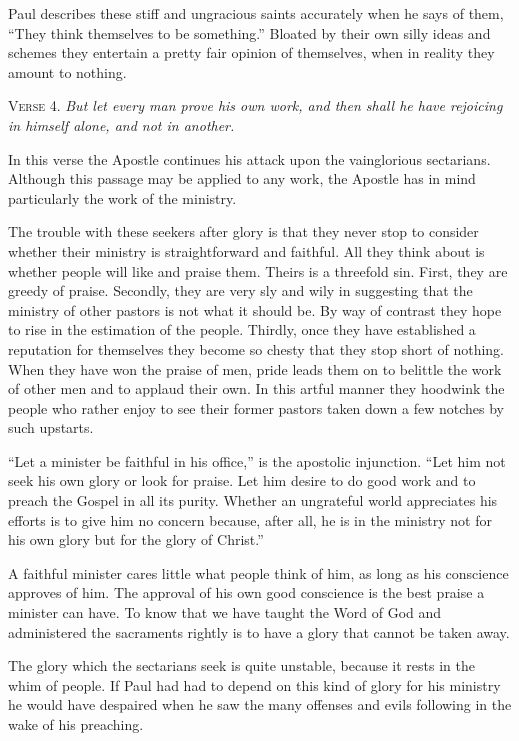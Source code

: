 Paul describes these stiff and ungracious saints accurately when he says of them, “They think themselves to be something.” Bloated by their own silly ideas and schemes they entertain a pretty fair opinion of themselves, when in reality they amount to nothing.

\textsc{Verse} 4. \emph{But let every man prove his own work, and then shall he have rejoicing in himself alone, and not in another.}

In this verse the Apostle continues his attack upon the vainglorious sectarians. Although this passage may be applied to any work, the Apostle has in mind particularly the work of the ministry.

The trouble with these seekers after glory is that they never stop to consider whether their ministry is straightforward and faithful. All they think about is whether people will like and praise them. Theirs is a threefold sin. First, they are greedy of praise. Secondly, they are very sly and wily in suggesting that the ministry of other pastors is not what it should be. By way of contrast they hope to rise in the estimation of the people. Thirdly, once they have established a reputation for themselves they become so chesty that they stop short of nothing. When they have won the praise of men, pride leads them on to belittle the work of other men and to applaud their own. In this artful manner they hoodwink the people who rather enjoy to see their former pastors taken down a few notches by such upstarts.

“Let a minister be faithful in his office,” is the apostolic injunction. “Let him not seek his own glory or look for praise. Let him desire to do good work and to preach the Gospel in all its purity. Whether an ungrateful world appreciates his efforts is to give him no concern because, after all, he is in the ministry not for his own glory but for the glory of Christ.”

A faithful minister cares little what people think of him, as long as his conscience approves of him. The approval of his own good conscience is the best praise a minister can have. To know that we have taught the Word of God and administered the sacraments rightly is to have a glory that cannot be taken away.

The glory which the sectarians seek is quite unstable, because it rests in the whim of people. If Paul had had to depend on this kind of glory for his ministry he would have despaired when he saw the many offenses and evils following in the wake of his preaching.


